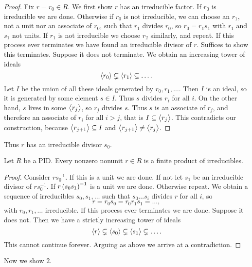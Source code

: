 \begin{proof}
Fix $ r = r_0 \in R $. We first show $ r $ has an irreducible factor. If $ r_0 $ is irreducible we are done. Otherwise if $ r_0 $ is not irreducible, we can choose an $ r_1 $, not a unit nor an associate of $ r_0 $, such that $ r_1 $ divides $ r_0 $, so $ r_0 = r_1s_1 $ with $ r_1 $ and $ s_1 $ not units. If $ r_1 $ is not irreducible we choose $ r_2 $ similarly, and repeat. If this process ever terminates we have found an irreducible divisor of $ r $. Suffices to show this terminates. Suppose it does not terminate. We obtain an increasing tower of ideals
$$ \left\langle r_0 \right\rangle \subsetneq \left\langle r_1 \right\rangle \subsetneq \dots. $$
Let $ I $ be the union of all these ideals generated by $ r_0, r_1, \dots $. Then $ I $ is an ideal, so it is generated by some element $ s \in I $. Thus $ s $ divides $ r_i $ for all $ i $. On the other hand, $ s $ lives in some $ \left\langle r_j \right\rangle $, so $ r_j $ divides $ s $. Thus $ s $ is an associate of $ r_j $, and therefore an associate of $ r_i $ for all $ i > j $, that is $ I \subseteq \left\langle r_j \right\rangle $. This contradicts our construction, because $ \left\langle r_{j + 1} \right\rangle \subseteq I $ and $ \left\langle r_{j + 1} \right\rangle \ne \left\langle r_j \right\rangle $.
\end{proof}

Thus $ r $ has an irreducible divisor $ s_0 $.

\pagebreak

\begin{lemma}
Let $ R $ be a PID. Every nonzero nonunit $ r \in R $ is a finite product of irreducibles.
\end{lemma}

\begin{proof}
Consider $ rs_0^{-1} $. If this is a unit we are done. If not let $ s_1 $ be an irreducible divisor of $ rs_0^{-1} $. If $ r\br{s_0s_1}^{-1} $ is a unit we are done. Otherwise repeat. We obtain a sequence of irreducibles $ s_0, s_1, \dots $ such that $ s_0 \dots s_i $ divides $ r $ for all $ i $, so
$$ r = r_0s_0 = r_0r_1s_1 = \dots, $$
with $ r_0, r_1, \dots $ irreducible. If this process ever terminates we are done. Suppose it does not. Then we have a strictly increasing tower of ideals
$$ \left\langle r \right\rangle \subsetneq \left\langle s_0 \right\rangle \subsetneq \left\langle s_1 \right\rangle \subsetneq \dots. $$
This cannot continue forever. Arguing as above we arrive at a contradiction.
\end{proof}

Now we show $ 2 $.


